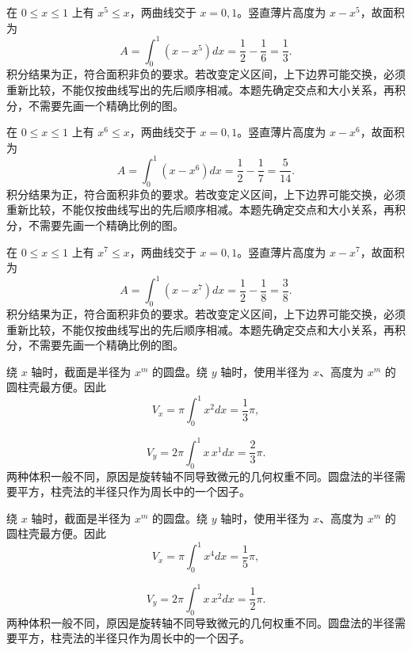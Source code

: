 \documentclass[UTF8,12pt,a4paper,fontset=fandol]{ctexart}
\begin{document}
\begin{solve}\label{ans:c21q4}
在 $0\le x\le1$ 上有 $x^{5}\le x$，两曲线交于 $x=0,1$。竖直薄片高度为 $x-x^{5}$，故面积为
\[
A=\int_0^1(x-x^{5})dx=\frac12-\frac1{6}=\frac{1}{3}.
\]
积分结果为正，符合面积非负的要求。若改变定义区间，上下边界可能交换，必须重新比较，不能仅按曲线写出的先后顺序相减。本题先确定交点和大小关系，再积分，不需要先画一个精确比例的图。
\end{solve}

\begin{solve}\label{ans:c21q5}
在 $0\le x\le1$ 上有 $x^{6}\le x$，两曲线交于 $x=0,1$。竖直薄片高度为 $x-x^{6}$，故面积为
\[
A=\int_0^1(x-x^{6})dx=\frac12-\frac1{7}=\frac{5}{14}.
\]
积分结果为正，符合面积非负的要求。若改变定义区间，上下边界可能交换，必须重新比较，不能仅按曲线写出的先后顺序相减。本题先确定交点和大小关系，再积分，不需要先画一个精确比例的图。
\end{solve}

\begin{solve}\label{ans:c21q6}
在 $0\le x\le1$ 上有 $x^{7}\le x$，两曲线交于 $x=0,1$。竖直薄片高度为 $x-x^{7}$，故面积为
\[
A=\int_0^1(x-x^{7})dx=\frac12-\frac1{8}=\frac{3}{8}.
\]
积分结果为正，符合面积非负的要求。若改变定义区间，上下边界可能交换，必须重新比较，不能仅按曲线写出的先后顺序相减。本题先确定交点和大小关系，再积分，不需要先画一个精确比例的图。
\end{solve}

\begin{solve}\label{ans:c21q7}
绕 $x$ 轴时，截面是半径为 $x^m$ 的圆盘。绕 $y$ 轴时，使用半径为 $x$、高度为 $x^m$ 的圆柱壳最方便。因此
\[
V_x=\pi\int_0^1x^{2}dx=\frac{1}{3}\pi,
\]

\[
V_y=2\pi\int_0^1x\,x^{1}dx=\frac{2}{3}\pi.
\]
两种体积一般不同，原因是旋转轴不同导致微元的几何权重不同。圆盘法的半径需要平方，柱壳法的半径只作为周长中的一个因子。
\end{solve}

\begin{solve}\label{ans:c21q8}
绕 $x$ 轴时，截面是半径为 $x^m$ 的圆盘。绕 $y$ 轴时，使用半径为 $x$、高度为 $x^m$ 的圆柱壳最方便。因此
\[
V_x=\pi\int_0^1x^{4}dx=\frac{1}{5}\pi,
\]

\[
V_y=2\pi\int_0^1x\,x^{2}dx=\frac{1}{2}\pi.
\]
两种体积一般不同，原因是旋转轴不同导致微元的几何权重不同。圆盘法的半径需要平方，柱壳法的半径只作为周长中的一个因子。
\end{solve}
\end{document}
